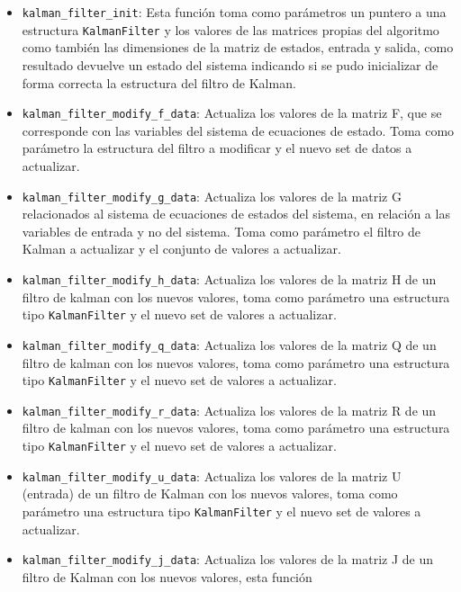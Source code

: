\documentclass[10pt, a4paper]{report}
\begin{document}
\begin{itemize}
    \item \texttt{kalman\_filter\_init}: Esta funci\'on toma como par\'ametros un
        puntero a una estructura \texttt{KalmanFilter} y los valores de las
        matrices propias del algoritmo como tambi\'en las dimensiones de la
        matriz de estados, entrada y salida, como resultado devuelve un estado
        del sistema indicando si se pudo inicializar de forma correcta la
        estructura del filtro de Kalman.
    \item \texttt{kalman\_filter\_modify\_f\_data}: Actualiza los valores de la
        matriz F, que se corresponde con las variables del sistema de ecuaciones
        de estado. Toma como par\'ametro la estructura del filtro a modificar y
        el nuevo set de datos a actualizar.
    \item \texttt{kalman\_filter\_modify\_g\_data}: Actualiza los valores de la
        matriz G relacionados al sistema de ecuaciones de estados del sistema,
        en relaci\'on a las variables de entrada y no del sistema. Toma como
        par\'ametro el filtro de Kalman a actualizar y el conjunto de valores a
        actualizar.
    \item \texttt{kalman\_filter\_modify\_h\_data}: Actualiza los valores de la
        matriz H de un filtro de kalman con los nuevos valores, toma como
        par\'ametro una estructura tipo \texttt{KalmanFilter} y el nuevo set de
        valores a actualizar.
    \item \texttt{kalman\_filter\_modify\_q\_data}: Actualiza los valores de la
        matriz Q de un filtro de kalman con los nuevos valores, toma como
        par\'ametro una estructura tipo \texttt{KalmanFilter} y el nuevo set de
        valores a actualizar.
    \item \texttt{kalman\_filter\_modify\_r\_data}: Actualiza los valores de la
        matriz R de un filtro de kalman con los nuevos valores, toma como
        par\'ametro una estructura tipo \texttt{KalmanFilter} y el nuevo set de
        valores a actualizar.
    \item \texttt{kalman\_filter\_modify\_u\_data}: Actualiza los valores de la
        matriz U (entrada) de un filtro de Kalman con los nuevos valores, toma 
        como par\'ametro una estructura tipo \texttt{KalmanFilter} y el nuevo 
        set de valores a actualizar.
    \item \texttt{kalman\_filter\_modify\_j\_data}: Actualiza los valores de la
        matriz J de un filtro de Kalman con los nuevos valores, esta funci\'on

\end{itemize}
\end{document}
